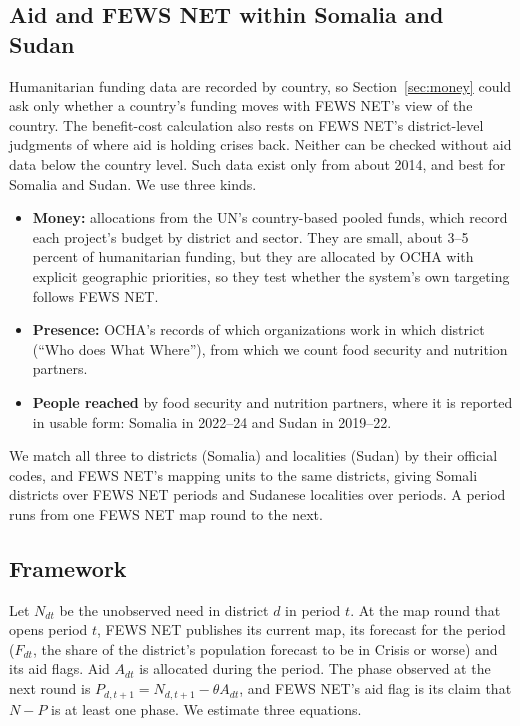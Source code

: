 \documentclass[11pt]{article}
\begin{document}
\begin{appendices}
\section{Aid and FEWS NET within Somalia and Sudan}\label{sec:within}

Humanitarian funding data are recorded by country, so Section~\ref{sec:money} could ask only whether a country's funding moves with FEWS NET's view of the country. The benefit-cost calculation also rests on FEWS NET's district-level judgments of where aid is holding crises back. Neither can be checked without aid data below the country level. Such data exist only from about 2014, and best for Somalia and Sudan. We use three kinds.
\begin{itemize}
  \item \textbf{Money:} allocations from the UN's country-based pooled funds, which record each project's budget by district and sector. They are small, about 3--5 percent of humanitarian funding, but they are allocated by OCHA with explicit geographic priorities, so they test whether the system's own targeting follows FEWS NET.
  \item \textbf{Presence:} OCHA's records of which organizations work in which district (``Who does What Where''), from which we count food security and nutrition partners.
  \item \textbf{People reached} by food security and nutrition partners, where it is reported in usable form: Somalia in 2022--24 and Sudan in 2019--22.
\end{itemize}
We match all three to districts (Somalia) and localities (Sudan) by their official codes, and FEWS NET's mapping units to the same districts, giving \subSoDistricts{} Somali districts over \subSoPeriods{} FEWS NET periods and \subSdDistricts{} Sudanese localities over \subSdPeriods{} periods. A period runs from one FEWS NET map round to the next.

\subsection*{Framework}

Let $N_{dt}$ be the unobserved need in district $d$ in period $t$. At the map round that opens period $t$, FEWS NET publishes its current map, its forecast for the period ($F_{dt}$, the share of the district's population forecast to be in Crisis or worse) and its aid flags. Aid $A_{dt}$ is allocated during the period. The phase observed at the next round is $P_{d,t+1} = N_{d,t+1} - \theta A_{dt}$, and FEWS NET's aid flag is its claim that $N - P$ is at least one phase. We estimate three equations.


\end{appendices}
\end{document}
